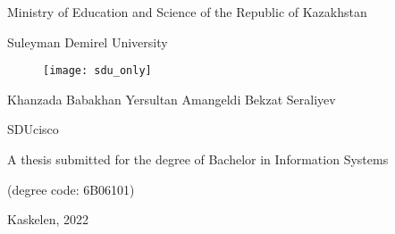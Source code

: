 \begin{titlepage}
\begin{center}
\large
Ministry of Education and Science of the Republic of Kazakhstan

Suleyman Demirel University

\vspace{1cm}
\begin{figure}[h]
    \centering
    \texttt{[image: sdu\_only]}
\end{figure}

\vspace{2cm}
\Large
\myauthor
Khanzada Babakhan
Yersultan Amangeldi
Bekzat Seraliyev


\vspace{1cm}
\Large
\textbf{\mytitle}
SDUcisco


\vspace{1cm}
\large
A thesis submitted for the degree of
 Bachelor in Information Systems


\mydegree

(degree code: \mydegreecode 6B06101)

\vfill
Kaskelen, 2022

\end{center}
\end{titlepage}
